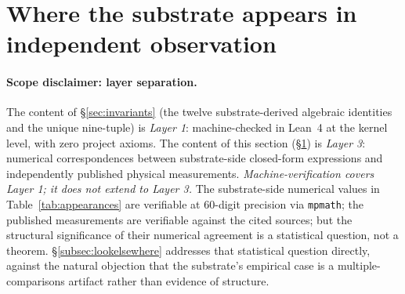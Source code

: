 \documentclass[11pt,a4paper]{amsart}
\theoremstyle{plain}
\theoremstyle{definition}
\begin{document}
\section{Where the substrate appears in independent observation}\label{sec:corroborations}

\paragraph{Scope disclaimer: layer separation.} The content of \S\ref{sec:invariants} (the twelve substrate-derived algebraic identities and the unique nine-tuple) is \emph{Layer 1}: machine-checked in Lean~4 at the kernel level, with zero project axioms. The content of this section (\S\ref{sec:corroborations}) is \emph{Layer 3}: numerical correspondences between substrate-side closed-form expressions and independently published physical measurements. \emph{Machine-verification covers Layer 1; it does not extend to Layer 3.} The substrate-side numerical values in Table~\ref{tab:appearances} are verifiable at 60-digit precision via \texttt{mpmath}; the published measurements are verifiable against the cited sources; but the structural significance of their numerical agreement is a statistical question, not a theorem. \S\ref{subsec:lookelsewhere} addresses that statistical question directly, against the natural objection that the substrate's empirical case is a multiple-comparisons artifact rather than evidence of structure.
\end{document}

